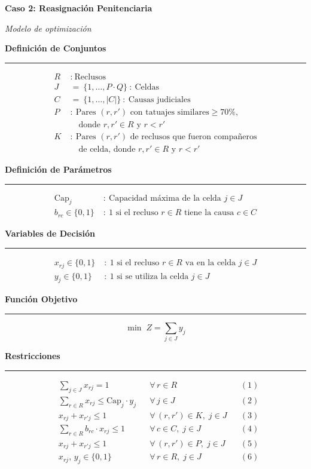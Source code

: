 \documentclass[11pt]{article}
\newcommand{\seccion}[1]{%
  \vspace{0.7em}%
  {\color{acento}\large\bfseries #1}\par%
  \vspace{-0.35em}%
  {\color{acento}\rule{\linewidth}{0.6pt}}\par%
  \vspace{0.55em}%
}
\begin{document}
{\color{acento}\Large\bfseries Caso 2: Reasignación Penitenciaria}\par
\vspace{0.2em}
{\itshape Modelo de optimización}\par

\seccion{Definición de Conjuntos}
\[
\begin{aligned}
R \;&:\ \text{Reclusos}\\[2pt]
J \;&=\ \{1,\ldots,P\cdot Q\}\ :\ \text{Celdas}\\[2pt]
C \;&=\ \{1,\ldots,|C|\}\ :\ \text{Causas judiciales}\\[2pt]
P \;&:\ \text{Pares } (r,r') \text{ con tatuajes similares} \geq 70\%,\\
   &\quad \text{donde } r,r' \in R \text{ y } r < r'\\[2pt]
K \;&:\ \text{Pares } (r,r') \text{ de reclusos que fueron compañeros}\\
   &\quad \text{de celda, donde } r,r' \in R \text{ y } r < r'
\end{aligned}
\]

\seccion{Definición de Parámetros}
\[
\begin{aligned}
\mathrm{Cap}_j \;&:\ \text{Capacidad máxima de la celda } j \in J\\[2pt]
b_{rc} \in \{0,1\} \;&:\ 1 \text{ si el recluso } r \in R \text{ tiene la causa } c \in C
\end{aligned}
\]

\seccion{Variables de Decisión}
\[
\begin{aligned}
x_{rj} \in \{0,1\} \;&:\ 1 \text{ si el recluso } r \in R \text{ va en la celda } j \in J\\[2pt]
y_{j} \in \{0,1\} \;&:\ 1 \text{ si se utiliza la celda } j \in J
\end{aligned}
\]

\seccion{Función Objetivo}
\[
\min \; Z = \sum_{j \in J} y_j
\]

\seccion{Restricciones}
\[
\begin{aligned}
& \sum_{j \in J} x_{rj} = 1
  && \forall\, r \in R && (1)\\[3pt]
& \sum_{r \in R} x_{rj} \leq \mathrm{Cap}_j \cdot y_j
  && \forall\, j \in J && (2)\\[3pt]
& x_{rj} + x_{r'j} \leq 1
  && \forall\, (r,r') \in K,\; j \in J && (3)\\[3pt]
& \sum_{r \in R} b_{rc} \cdot x_{rj} \leq 1
  && \forall\, c \in C,\; j \in J && (4)\\[3pt]
& x_{rj} + x_{r'j} \leq 1
  && \forall\, (r,r') \in P,\; j \in J && (5)\\[3pt]
& x_{rj},\, y_j \in \{0,1\}
  && \forall\, r \in R,\; j \in J && (6)
\end{aligned}
\]
\end{document}
